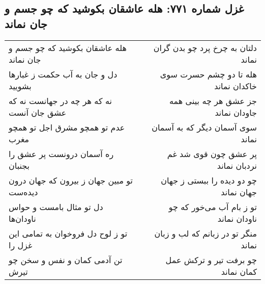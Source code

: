 \begin{center}
\section*{غزل شماره ۷۷۱: هله عاشقان بکوشید که چو جسم و جان نماند}
\label{sec:0771}
\begin{longtable}{l p{0.5cm} r}
هله عاشقان بکوشید که چو جسم و جان نماند
&&
دلتان به چرخ پرد چو بدن گران نماند
\\
دل و جان به آب حکمت ز غبارها بشویید
&&
هله تا دو چشم حسرت سوی خاکدان نماند
\\
نه که هر چه در جهانست نه که عشق جان آنست
&&
جز عشق هر چه بینی همه جاودان نماند
\\
عدم تو همچو مشرق اجل تو همچو مغرب
&&
سوی آسمان دیگر که به آسمان نماند
\\
ره آسمان درونست پر عشق را بجنبان
&&
پر عشق چون قوی شد غم نردبان نماند
\\
تو مبین جهان ز بیرون که جهان درون دیده‌ست
&&
چو دو دیده را ببستی ز جهان جهان نماند
\\
دل تو مثال بامست و حواس ناودان‌ها
&&
تو ز بام آب می‌خور که چو ناودان نماند
\\
تو ز لوح دل فروخوان به تمامی این غزل را
&&
منگر تو در زبانم که لب و زبان نماند
\\
تن آدمی کمان و نفس و سخن چو تیرش
&&
چو برفت تیر و ترکش عمل کمان نماند
\\
\end{longtable}
\end{center}
